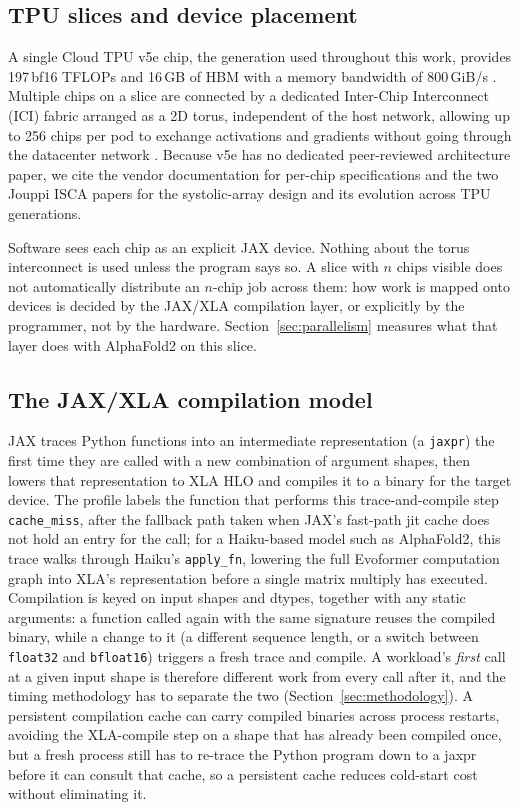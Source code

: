 
\subsection{TPU slices and device placement}
\label{sec:bg-tpu}

A single Cloud TPU v5e chip, the generation used throughout this
work, provides 197\,bf16 TFLOPs and 16\,GB of HBM with a memory bandwidth of 800\,GiB/s
\citep{googletpuv5e}. Multiple chips on a slice are connected by a
dedicated Inter-Chip Interconnect (ICI) fabric arranged as a 2D torus,
independent of the host network, allowing up to 256 chips per pod to
exchange activations and gradients without going through the datacenter
network \citep{googletpuv5e}. Because v5e has no dedicated
peer-reviewed architecture paper, we cite the vendor documentation for
per-chip specifications and the two Jouppi ISCA papers
\citep{jouppi2017tpu, jouppi2023tpuv4} for the systolic-array design and
its evolution across TPU generations.

Software sees each chip as an explicit JAX device. Nothing about the
torus interconnect is used unless the program says so. A slice with
$n$ chips visible does not automatically distribute an $n$-chip job
across them: how work is mapped onto devices is decided by the JAX/XLA
compilation layer, or explicitly by the programmer, not by the
hardware. Section~\ref{sec:parallelism} measures what that layer does
with AlphaFold2 on this slice.

\subsection{The JAX/XLA compilation model}
\label{sec:bg-jax}

JAX traces Python functions into an intermediate representation
(a \texttt{jaxpr}) the first time they are called with a new
combination of argument shapes, then lowers that representation to
XLA HLO and compiles it to a binary for the target device. The
profile labels the function that performs this trace-and-compile step
\texttt{cache\_miss}, after the fallback path taken when JAX's
fast-path jit cache does not hold an entry for the call; for a
Haiku-based model such as AlphaFold2, this trace walks through
Haiku's \texttt{apply\_fn}, lowering the full Evoformer computation
graph into XLA's representation before a single matrix multiply has
executed. Compilation is keyed on input shapes and dtypes, together
with any static arguments: a function called again with the same
signature reuses the compiled binary, while a change to it (a different
sequence length, or a switch between \texttt{float32} and
\texttt{bfloat16}) triggers a fresh trace and compile. A workload's
\emph{first} call at a given input shape is therefore different work
from every call after it, and the timing methodology has to separate
the two (Section~\ref{sec:methodology}). A persistent compilation
cache can carry compiled binaries across process restarts, avoiding
the XLA-compile step on a shape that has already been compiled once,
but a fresh process still has to re-trace the Python program down to a
jaxpr before it can consult that cache, so a persistent cache reduces
cold-start cost without eliminating it.

